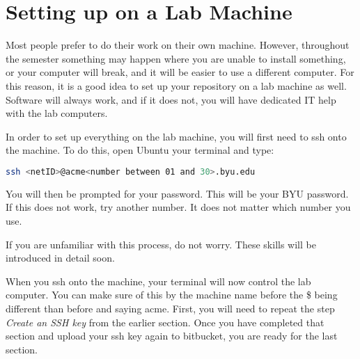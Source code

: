 


\ifbootcamp

\section*{Setting up on a Lab Machine}
Most people prefer to do their work on their own machine.
However, throughout the semester something may happen where you are unable to install something, or your computer will break, and it will be easier to use a different computer.
For this reason, it is a good idea to set up your repository on a lab machine as well.
Software will always work, and if it does not, you will have dedicated IT help with the lab computers.

In order to set up everything on the lab machine, you will first need to ssh onto the machine.
To do this, open 
\ifwindows
Ubuntu
\else
your terminal
\fi
and type:
\begin{lstlisting}[language=bash]
ssh <netID>@acme<number between 01 and 30>.byu.edu
\end{lstlisting}
You will then be prompted for your password.
This will be your BYU password.
If this does not work, try another number. 
It does not matter which number you use.

If you are unfamiliar with this process, do not worry.
These skills will be introduced in detail soon.

When you ssh onto the machine, your terminal will now control the lab computer.
You can make sure of this by the machine name before the \$ being different than before and saying acme.
First, you will need to repeat the step \emph{Create an SSH key} from the earlier section.
Once you have completed that section and upload your ssh key again to bitbucket, you are ready for the last section.


